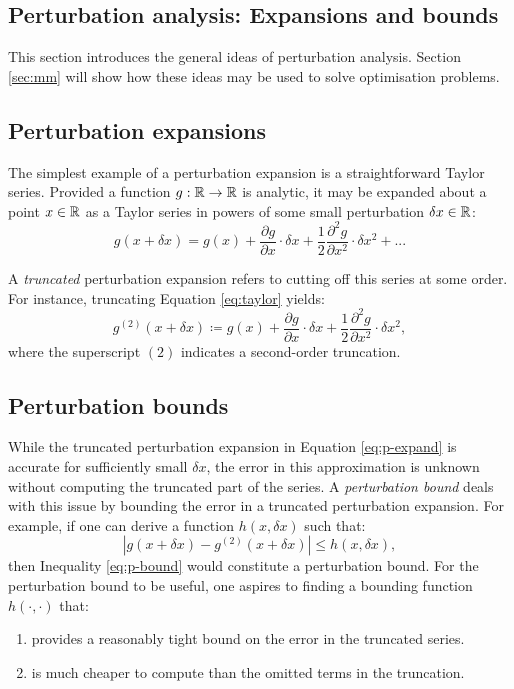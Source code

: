 \begin{refsection}
\section{Perturbation analysis: Expansions and bounds}
This section introduces the general ideas of perturbation analysis. Section \ref{sec:mm} will show how these ideas may be used to solve optimisation problems.

\subsection{Perturbation expansions}
The simplest example of a perturbation expansion is a straightforward Taylor series. Provided a function $g:\mathbb{R}\to\mathbb{R}$ is analytic, it may be expanded about a point $x\in\mathbb{R}$ as a Taylor series in powers of some small perturbation $\delta x\in\mathbb{R}$:
\begin{equation}\label{eq:taylor}
    g(x+\delta x) = g(x) + \frac{\partial g}{\partial x}\cdot\delta x + \frac{1}{2} \frac{\partial^2 g}{\partial x^2}\cdot\delta x^2 + ...
\end{equation}

A \textit{truncated} perturbation expansion refers to cutting off this series at some order. For instance, truncating Equation \ref{eq:taylor} yields:
\begin{equation}\label{eq:p-expand}
    g^{(2)}(x+\delta x) \coloneqq g(x) + \frac{\partial g}{\partial x}\cdot\delta x + \frac{1}{2} \frac{\partial^2 g}{\partial x^2}\cdot\delta x^2,
\end{equation}
where the superscript $(2)$ indicates a second-order truncation.

\subsection{Perturbation bounds}
While the truncated perturbation expansion in Equation \ref{eq:p-expand} is accurate for sufficiently small $\delta x$, the error in this approximation is unknown without computing the truncated part of the series. A \textit{perturbation bound} deals with this issue by bounding the error in a truncated perturbation expansion. For example, if one can derive a function $h(x,\delta x)$ such that:
\begin{equation}\label{eq:p-bound}
    \left|g(x+\delta x) - g^{(2)}(x+\delta x)\right| \leq h(x,\delta x),
\end{equation}
then Inequality \ref{eq:p-bound} would constitute a perturbation bound. For the perturbation bound to be useful, one aspires to finding a bounding function $h(\cdot,\cdot)$ that:
\begin{enumerate}
    \item provides a reasonably tight bound on the error in the truncated series.
    \item is much cheaper to compute than the omitted terms in the truncation.
\end{enumerate}


\end{refsection}
